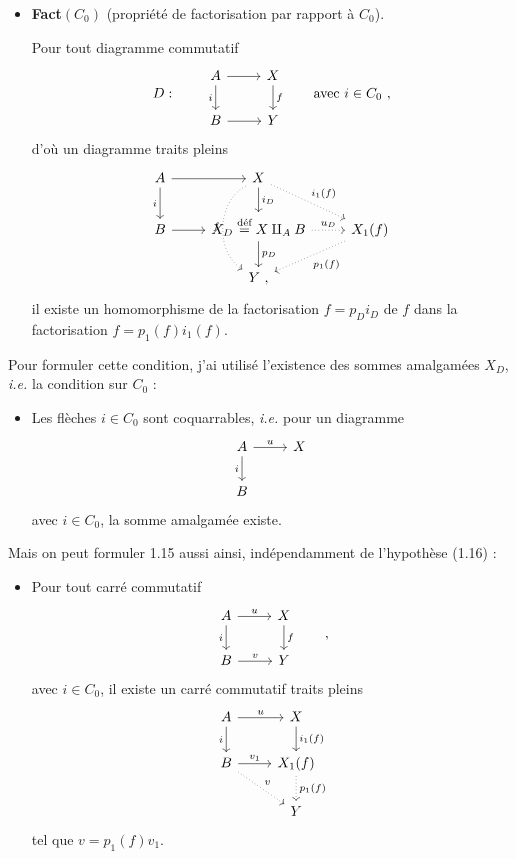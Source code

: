\documentclass[11pt]{article}
\newcommand{\printedpage}[1]{\marginpar{\footnotesize p.~#1}}
\newcommand{\msp}[1]{\marginpar{\footnotesize [#1]}}
\begin{document}
\begin{itemize}[leftmargin=5em, labelwidth=4em, labelsep=1em, align=left]
\item[(1.15)] \textbf{Fact}$(C_0)$ (propriété de factorisation par rapport à $C_0$).

Pour tout diagramme commutatif
\[
D : \qquad
\begin{tikzcd}
A \arrow[r] \arrow[d, "i"'] & X \arrow[d, "f"] \\
B \arrow[r] & Y
\end{tikzcd}
\qquad \text{avec } i \in C_0 \ ,
\]
d'où un diagramme traits pleins
\[
\begin{tikzcd}
A \arrow[r] \arrow[d, "i"'] & X \arrow[d, "i_D"] \arrow[dr, dotted, "i_1(f)"] \arrow[dd, dotted, bend right=60, "f"'] & \\
B \arrow[r] & X_D \overset{\text{déf}}{=} X \amalg_A B \arrow[r, dotted, "u_D"] \arrow[d, "p_D"] & X_1(f) \arrow[dl, dotted, "p_1(f)"] \\
 & Y \ , &
\end{tikzcd}
\]
\printedpage{5}
il existe un homomorphisme de la factorisation $f = p_D i_D$ de $f$ dans la factorisation $f = p_1(f)i_1(f)$.
\end{itemize}

Pour formuler cette condition, j'ai utilisé l'existence des sommes amalgamées $X_D$, \textit{i.e.} la condition sur $C_0$ :

\msp{page 6}

\begin{itemize}[leftmargin=5em, labelwidth=4em, labelsep=1em, align=left]
\item[(1.16)] Les flèches $i \in C_0$ sont coquarrables, \textit{i.e.} pour un diagramme
\[
\begin{tikzcd}
A \arrow[r, "u"] \arrow[d, "i"'] & X \\
B &
\end{tikzcd}
\]
avec $i \in C_0$, la somme amalgamée existe.
\end{itemize}

Mais on peut formuler 1.15 aussi ainsi, indépendamment de l'hypothèse (1.16) :

\begin{itemize}[leftmargin=5em, labelwidth=4em, labelsep=1em, align=left]
\item[(1.17)] Pour tout carré commutatif
\[
\begin{tikzcd}
A \arrow[r, "u"] \arrow[d, "i"'] & X \arrow[d, "f"] \\
B \arrow[r, "v"] & Y
\end{tikzcd}
\qquad ,
\]
avec $i \in C_0$, il existe un carré commutatif traits pleins
\[
\begin{tikzcd}
A \arrow[r, "u"] \arrow[d, "i"'] & X \arrow[d, "i_1(f)"] \\
B \arrow[r, "v_1"] \arrow[dr, dotted, "v"] & X_1(f) \arrow[d, dotted, "p_1(f)"] \\
 & Y
\end{tikzcd}
\]
tel que $v = p_1(f)v_1$.
\end{itemize}
\end{document}
